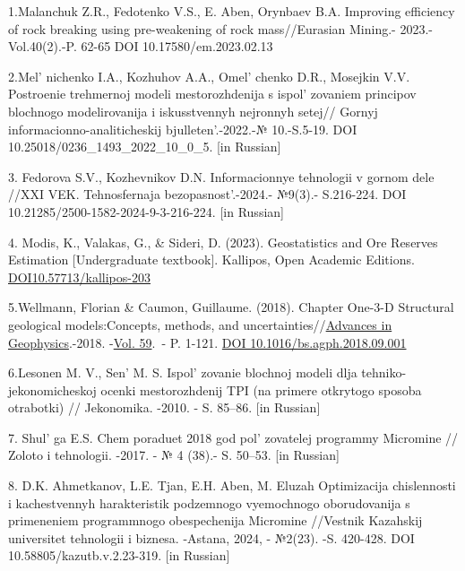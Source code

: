 \begin{references}

1.Malanchuk Z.R., Fedotenko V.S., E. Aben, Orynbaev B.A. Improving
efficiency of rock breaking using pre-weakening of rock mass//Eurasian
Mining.- 2023.-Vol.40(2).-P. 62-65
\linebreak DOI 10.17580/em.2023.02.13

2.Mel' nichenko I.A., Kozhuhov A.A.,
Omel' chenko D.R., Mosejkin V.V. Postroenie trehmernoj modeli mestorozhdenija s
ispol' zovaniem principov blochnogo modelirovanija i
iskusstvennyh nejronnyh setej// Gornyj informacionno-analiticheskij
bjulleten'.-2022.-№ 10.-S.5-19. \linebreak DOI
10.25018/0236\_1493\_2022\_10\_0\_5. {[}in Russian{]}

3. Fedorova S.V., Kozhevnikov D.N. Informacionnye tehnologii v gornom
dele //XXI VEK. Tehnosfernaja bezopasnost'.-2024.-
№9(3).- S.216-224.
\linebreak DOI 10.21285/2500-1582-2024-9-3-216-224. {[}in Russian{]}

4. Modis, K., Valakas, G., \& Sideri, D. (2023). Geostatistics and Ore
Reserves Estimation {[}Undergraduate textbook{]}. Kallipos, Open
Academic Editions.
\href{http://dx.doi.org/10.57713/kallipos-203}{DOI10.57713/kallipos-203}

5.Wellmann, Florian \& Caumon, Guillaume. (2018). Chapter One-3-D
Structural geological models:\linebreak Concepts, methods, and
uncertainties//\href{https://www.sciencedirect.com/bookseries/advances-in-geophysics}{Advances
in Geophysics}.-2018. -\href{https://www.sciencedirect.com/bookseries/advances-in-geophysics/vol/59/suppl/C}{Vol.
59}.~- P. 1-121. \linebreak \href{http://dx.doi.org/10.1016/bs.agph.2018.09.001}{DOI
10.1016/bs.agph.2018.09.001} \hl{}

6.Lesonen M. V., Sen'{} M. S.
Ispol' zovanie blochnoj modeli dlja
tehniko-jekonomicheskoj ocenki \linebreak mestorozhdenij TPI (na primere otkrytogo
sposoba otrabotki) // Jekonomika. -2010. - S. 85--86. {[}in Russian{]}

7. Shul' ga E.S. Chem poraduet 2018 god
pol' zovatelej programmy Micromine // Zoloto i
tehnologii. -2017. - № 4 (38).- S. 50--53. {[}in Russian{]}

8. D.K. Ahmetkanov, L.E. Tjan, E.H. Aben, M. Eluzah Optimizacija
chislennosti i kachestvennyh \linebreak harakteristik podzemnogo vyemochnogo
oborudovanija s primeneniem programmnogo obespechenija \linebreak Micromine
//Vestnik Kazahskij universitet tehnologii i biznesa. -Astana, 2024, -
№2(23). -S. 420-428. DOI 10.58805/kazutb.v.2.23-319. {[}in Russian{]}


\end{references}
